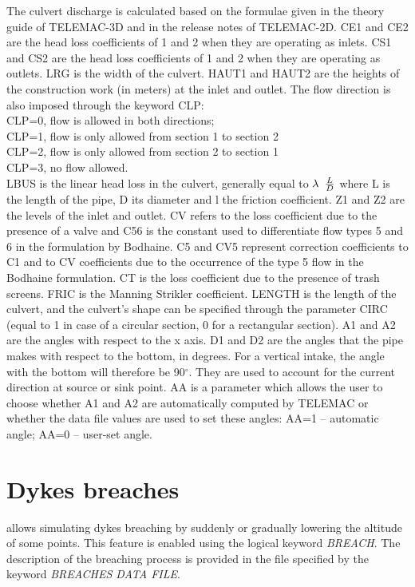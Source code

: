 The culvert discharge is calculated based on the formulae given in the theory guide of TELEMAC-3D 
and in the release notes of TELEMAC-2D.
CE1 and CE2 are the head loss coefficients of 1 and 2 when they are operating as inlets. 
CS1 and CS2 are the head loss coefficients of 1 and 2 when they are operating as outlets. 
LRG is the width of the culvert.
HAUT1 and HAUT2 are the heights of the construction work (in meters) at the inlet and outlet.
The flow direction is also imposed through the keyword CLP:\\
CLP=0, flow is allowed in both directions;\\
CLP=1, flow is only allowed from section 1 to section 2\\
CLP=2, flow is only allowed from section 2 to section 1\\
CLP=3, no flow allowed.\\
LBUS is the linear head loss in the culvert, generally equal to $\lambda {\kern 1pt} {\kern 1pt} {\kern 1pt} {\kern 1pt} {\kern 1pt} \frac{L}{D} $ where L is the length of the pipe, D its diameter and l the friction coefficient.
Z1 and Z2 are the levels of the inlet and outlet.
CV refers to the loss coefficient due to the presence of a valve and
C56 is the constant used to differentiate flow types 5 and 6 in the formulation by Bodhaine.
C5 and CV5 represent correction coefficients to C1 and to CV coefficients 
due to the occurrence of the type 5 flow in the Bodhaine formulation.
CT is the loss coefficient due to the presence of trash screens.
FRIC is the Manning Strikler coefficient.
LENGTH is the length of the culvert, and the culvert's shape can be specified through the parameter CIRC (equal to 1 in 
case of a circular section, 0 for a rectangular section).
A1 and A2 are the angles with respect to the x axis. 
D1 and D2 are the angles that the pipe makes with respect to the bottom, in degrees. 
For a vertical intake, the angle with the bottom will therefore be 90${}^\circ$.
They are used to account for the current direction at source or sink point.
AA is a parameter which allows the user to choose whether A1 and A2 are automatically computed by TELEMAC
or whether the data file values are used to set these angles: AA=1 -- automatic angle; AA=0 -- user-set angle.

\section{ Dykes breaches}
\label{sec:dykes}
  allows simulating dykes breaching by suddenly or gradually lowering the altitude of some points. This feature is enabled using the logical keyword \textit{BREACH}. The description of the breaching process is provided in the file specified by the keyword \textit{BREACHES DATA FILE}.

